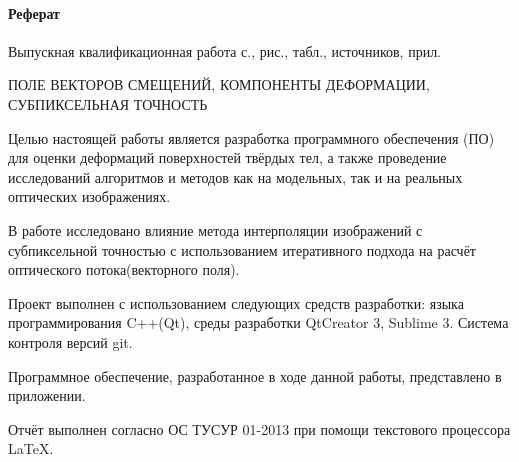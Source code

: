 \newpage
{}
\paragraph{\hfill Реферат \hfill}
Выпускная квалификационная работа  с.,  рис.,  табл.,  источников,  прил.


ПОЛЕ ВЕКТОРОВ СМЕЩЕНИЙ, КОМПОНЕНТЫ ДЕФОРМАЦИИ, СУБПИКСЕЛЬНАЯ ТОЧНОСТЬ

Целью настоящей работы является разработка программного обеспечения (ПО) для оценки деформаций поверхностей твёрдых тел, а также проведение исследований алгоритмов и методов как на модельных, так и на реальных оптических изображениях.

В работе исследовано влияние метода интерполяции изображений с субпиксельной точностью с использованием итеративного подхода на расчёт оптического потока(векторного поля).

Проект выполнен с использованием следующих средств разработки: языка программирования C++(Qt), среды разработки QtCreator 3, Sublime 3. Система контроля версий git.

Программное обеспечение, разработанное в ходе данной работы, представлено в приложении.

Отчёт выполнен согласно ОС ТУСУР 01-2013 при помощи текстового процессора \LaTeX.